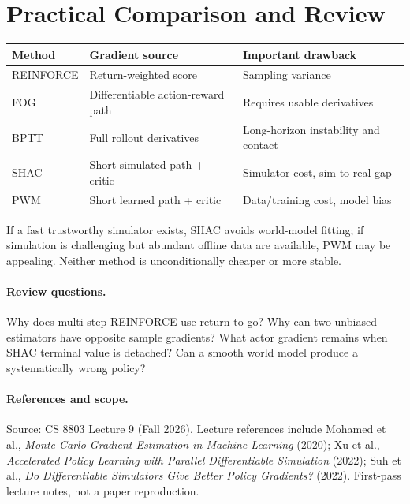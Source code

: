 \section{Practical Comparison and Review}
\begin{center}\small
\begin{tabularx}{\textwidth}{@{}p{}X X@{}}\toprule
Method & Gradient source & Important drawback\\\midrule
REINFORCE & Return-weighted score & Sampling variance\\
FOG & Differentiable action-reward path & Requires usable derivatives\\
BPTT & Full rollout derivatives & Long-horizon instability and contact\\
SHAC & Short simulated path + critic & Simulator cost, sim-to-real gap\\
PWM & Short learned path + critic & Data/training cost, model bias\\\bottomrule
\end{tabularx}
\end{center}
If a fast trustworthy simulator exists, SHAC avoids world-model fitting; if simulation is challenging but abundant offline data are available, PWM may be appealing. Neither method is unconditionally cheaper or more stable.

\paragraph{Review questions.} Why does multi-step REINFORCE use return-to-go? Why can two unbiased estimators have opposite sample gradients? What actor gradient remains when SHAC terminal value is detached? Can a smooth world model produce a systematically wrong policy?

\paragraph{References and scope.} Source: CS 8803 Lecture 9 (Fall 2026). Lecture references include Mohamed et al., \emph{Monte Carlo Gradient Estimation in Machine Learning} (2020); Xu et al., \emph{Accelerated Policy Learning with Parallel Differentiable Simulation} (2022); Suh et al., \emph{Do Differentiable Simulators Give Better Policy Gradients?} (2022). First-pass lecture notes, not a paper reproduction.
